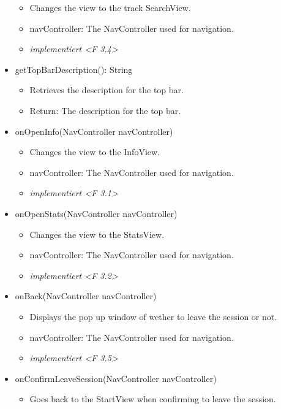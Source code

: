 \documentclass[oneside, ngerman]{sdqtechreport}
\begin{document}
\begin{itemize}
\begin{itemize}
            \item Changes the view to the track SearchView.
            \item navController: The NavController used for navigation.
            \item \textit{implementiert <F 3.4>}
        \end{itemize}
    \item getTopBarDescription(): String
        \begin{itemize}
            \item Retrieves the description for the top bar.
            \item Return: The description for the top bar.
        \end{itemize}
    \item onOpenInfo(NavController navController)
        \begin{itemize}
            \item Changes the view to the InfoView.
            \item navController: The NavController used for navigation.
            \item \textit{implementiert <F 3.1>}
        \end{itemize}
    \item onOpenStats(NavController navController)
        \begin{itemize}
            \item Changes the view to the StatsView.
            \item navController: The NavController used for navigation.
            \item \textit{implementiert <F 3.2>}
        \end{itemize}
    \item onBack(NavController navController)
        \begin{itemize}
            \item Displays the pop up window of wether to leave the session or not.
            \item navController: The NavController used for navigation.
            \item \textit{implementiert <F 3.5>}
        \end{itemize}
    \item onConfirmLeaveSession(NavController navController)
        \begin{itemize}
            \item Goes back to the StartView when confirming to leave the session.

\end{itemize}
\end{itemize}
\end{document}
